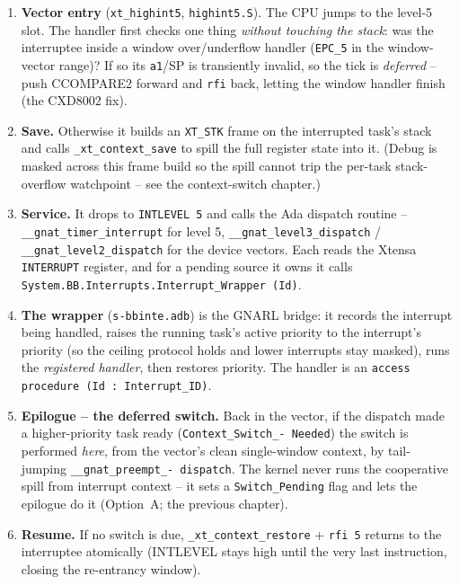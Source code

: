 \begin{enumerate}
  \item \textbf{Vector entry} (\texttt{xt\_highint5}, \texttt{highint5.S}). The
        CPU jumps to the level-5 slot. The handler first checks one thing
        \emph{without touching the stack}: was the interruptee inside a window
        over/underflow handler (\texttt{EPC\_5} in the window-vector range)? If so
        its \texttt{a1}/SP is transiently invalid, so the tick is \emph{deferred}
        -- push CCOMPARE2 forward and \texttt{rfi} back, letting the window
        handler finish (the CXD8002 fix).
  \item \textbf{Save.} Otherwise it builds an \texttt{XT\_STK} frame on the
        interrupted task's stack and calls \texttt{\_xt\_context\_save} to spill
        the full register state into it. (Debug is masked across this frame build
        so the spill cannot trip the per-task stack-overflow watchpoint -- see
        the context-switch chapter.)
  \item \textbf{Service.} It drops to \texttt{INTLEVEL 5} and calls the Ada
        dispatch routine -- \texttt{\_\_gnat\_timer\_interrupt} for level 5,
        \texttt{\_\_gnat\_level3\_dispatch} / \texttt{\_\_gnat\_level2\_dispatch}
        for the device vectors. Each reads the Xtensa \texttt{INTERRUPT} register,
        and for a pending source it owns it calls
        \texttt{System.BB.Interrupts.Interrupt\_Wrapper (Id)}.
  \item \textbf{The wrapper} (\texttt{s-bbinte.adb}) is the GNARL bridge: it
        records the interrupt being handled, raises the running task's active
        priority to the interrupt's priority (so the ceiling protocol holds and
        lower interrupts stay masked), runs the \emph{registered handler}, then
        restores priority. The handler is an
        \texttt{access procedure (Id : Interrupt\_ID)}.
  \item \textbf{Epilogue -- the deferred switch.} Back in the vector, if the
        dispatch made a higher-priority task ready (\texttt{Context\_Switch\_-
        Needed}) the switch is performed \emph{here}, from the vector's clean
        single-window context, by tail-jumping \texttt{\_\_gnat\_preempt\_-
        dispatch}. The kernel never runs the cooperative spill from interrupt
        context -- it sets a \texttt{Switch\_Pending} flag and lets the epilogue
        do it (Option~A; the previous chapter).
  \item \textbf{Resume.} If no switch is due, \texttt{\_xt\_context\_restore} +
        \texttt{rfi 5} returns to the interruptee atomically (INTLEVEL stays high
        until the very last instruction, closing the re-entrancy window).
\end{enumerate}

